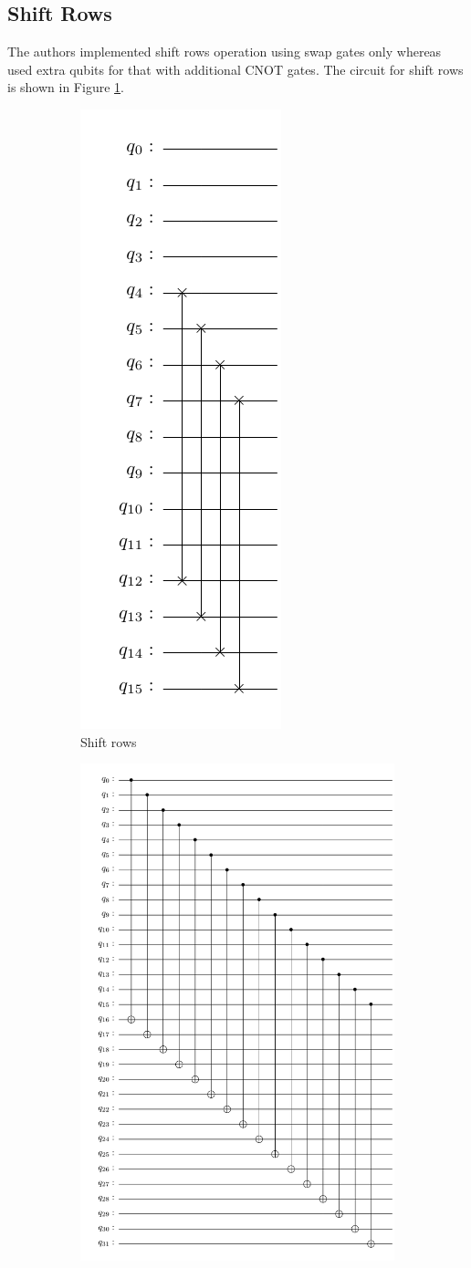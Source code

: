\documentclass[preprint]{transcrypto}
\begin{document}
\subsection{Shift Rows}
The authors implemented shift rows operation using swap gates only whereas \cite{Almazrooie} used extra qubits for that with additional CNOT gates. The circuit for shift rows is shown in Figure \ref{fig:sr21}.

\begin{figure}[h!]
\centering
\begin{subfigure}{.5\textwidth}
  \centering
  \includegraphics[width=0.3\linewidth]{saes21/sr.pdf}
  \caption{Shift rows}
  \label{fig:sr21}
\end{subfigure}%
\begin{subfigure}{.5\textwidth}
  \centering
  \includegraphics[width=0.6\linewidth]{saes21/ark.pdf}

\end{subfigure}
\end{figure}
\end{document}
